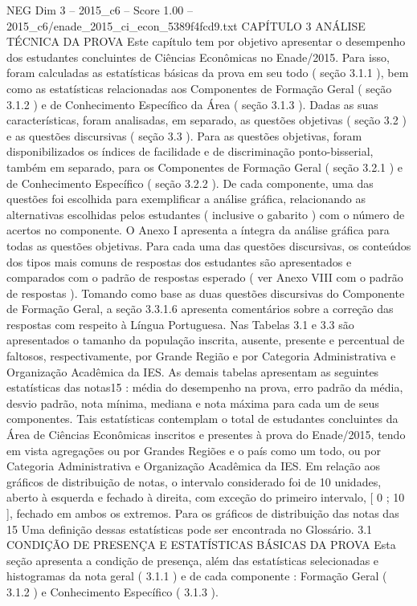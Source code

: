 \begin{textsample}{NEG Dim 3 – 2015\_c6 – Score 1.00 – 2015\_c6/enade\_2015\_ci\_econ\_5389f4fcd9.txt}  \label{ex:f3_neg_070}
CAPÍTULO 3 ANÁLISE TÉCNICA DA PROVA Este capítulo tem por objetivo apresentar o desempenho dos estudantes concluintes de Ciências Econômicas no Enade/2015.
Para isso, foram calculadas as estatísticas básicas da prova em seu todo ( seção 3.1.1 ), bem como as estatísticas relacionadas aos Componentes de Formação Geral ( seção 3.1.2 ) e de Conhecimento Específico da Área ( seção 3.1.3 ).
Dadas as suas características, foram analisadas, em separado, as questões objetivas ( seção 3.2 ) e as questões discursivas ( seção 3.3 ).
Para as questões objetivas, foram disponibilizados os índices de facilidade e de discriminação ponto-bisserial, também em separado, para os Componentes de Formação Geral ( seção 3.2.1 ) e de Conhecimento Específico ( seção 3.2.2 ).
De cada componente, uma das questões foi escolhida para exemplificar a análise gráfica, relacionando as alternativas escolhidas pelos estudantes ( inclusive o gabarito ) com o número de acertos no componente.
O Anexo I apresenta a íntegra da análise gráfica para todas as questões objetivas.
Para cada uma das questões discursivas, os conteúdos dos tipos mais comuns de respostas dos estudantes são apresentados e comparados com o padrão de respostas esperado ( ver Anexo VIII com o padrão de respostas ).
Tomando como base as duas questões discursivas do Componente de Formação Geral, a seção 3.3.1.6 apresenta comentários sobre a correção das respostas com respeito à Língua Portuguesa.
Nas Tabelas 3.1 e 3.3 são apresentados o tamanho da população inscrita, ausente, presente e percentual de faltosos, respectivamente, por Grande Região e por Categoria Administrativa e Organização Acadêmica da IES.
As demais tabelas apresentam as seguintes estatísticas das notas15 : média do desempenho na prova, erro padrão da média, desvio padrão, nota mínima, mediana e nota máxima para cada um de seus componentes.
Tais estatísticas contemplam o total de estudantes concluintes da Área de Ciências Econômicas inscritos e presentes à prova do Enade/2015, tendo em vista agregações ou por Grandes Regiões e o país como um todo, ou por Categoria Administrativa e Organização Acadêmica da IES.
Em relação aos gráficos de distribuição de notas, o intervalo considerado foi de 10 unidades, aberto à esquerda e fechado à direita, com exceção do primeiro intervalo, [ 0 ; 10 ], fechado em ambos os extremos.
Para os gráficos de distribuição das notas das 15 Uma definição dessas estatísticas pode ser encontrada no Glossário. 3.1 CONDIÇÃO DE PRESENÇA E ESTATÍSTICAS BÁSICAS DA PROVA Esta seção apresenta a condição de presença, além das estatísticas selecionadas e histogramas da nota geral ( 3.1.1 ) e de cada componente : Formação Geral ( 3.1.2 ) e Conhecimento Específico ( 3.1.3 ).

\end{textsample}
